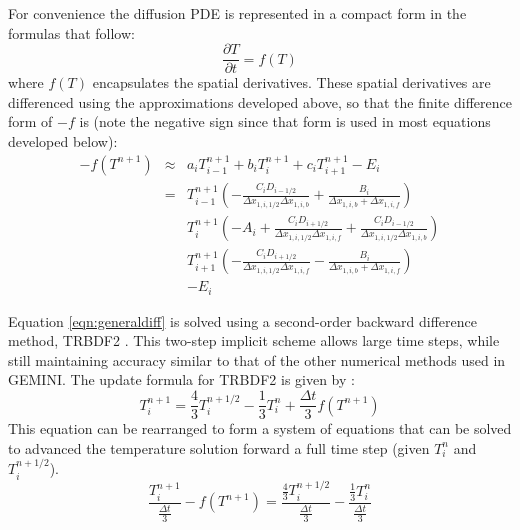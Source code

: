 \documentclass[11pt,letterpaper]{article}
\begin{document}
For convenience the diffusion PDE is represented in a compact form in the formulas that follow:
\begin{equation}
\frac{\partial T}{\partial t} = f(T)
\end{equation}
where $f(T)$ encapsulates the spatial derivatives.  These spatial derivatives are differenced using the approximations developed above, so that the finite difference form of $-f$ is (note the negative sign since that form is used in most equations developed below):
\begin{eqnarray}
-f(T^{n+1}) &\approx& a_i T^{n+1}_{i-1} + b_i T^{n+1}_{i} + c_i T^{n+1}_{i+1} - E_i\nonumber \\
&=& T^{n+1}_{i-1} \left( - \frac{C_i D_{i-1/2}}{\Delta x_{1,i,1/2} \Delta x_{1,i,b}} + \frac{B_i}{\Delta x_{1,i,b} + \Delta x_{1,i,f}} \right) \nonumber \\
&~&  T^{n+1}_{i} \left( - A_i + \frac{C_i D_{i+1/2}}{\Delta x_{1,i,1/2} \Delta x_{1,i,f}} + \frac{C_i D_{i-1/2}}{\Delta x_{1,i,1/2} \Delta x_{1,i,b}} \right) \nonumber \\
&~&  T^{n+1}_{i+1} \left( - \frac{C_i D_{i+1/2}}{\Delta x_{1,i,1/2} \Delta x_{1,i,f}} - \frac{B_i}{\Delta x_{1,i,b} + \Delta x_{1,i,f}} \right) \nonumber \\
&~& - E_i
\end{eqnarray}

Equation \ref{eqn:generaldiff} is solved using a second-order backward difference method, TRBDF2 \citep{Leveque:2002,Leveque:2007}.  This two-step implicit scheme allows large time steps, while still maintaining accuracy similar to that of the other numerical methods used in GEMINI.  The update formula for TRBDF2 is given by \citep{Leveque:2002,Leveque:2007}:
\begin{equation}
T_i^{n+1} = \frac{4}{3} T_i^{n+1/2} - \frac{1}{3} T_i^{n} + \frac{\Delta t}{3} f(T^{n+1})
\end{equation}
This equation can be rearranged to form a system of equations that can be solved to advanced the temperature solution forward a full time step (given $T_i^{n}$ and $T_i^{n+1/2}$).  
\begin{equation}
\frac{T_i^{n+1}}{\frac{\Delta t}{3}} - f(T^{n+1})= \frac{\frac{4}{3} T_i^{n+1/2}}{\frac{\Delta t}{3}} - \frac{\frac{1}{3} T_i^{n}}{\frac{\Delta t}{3}} \label{eqn:TRBDF2}
\end{equation}
\end{document}
